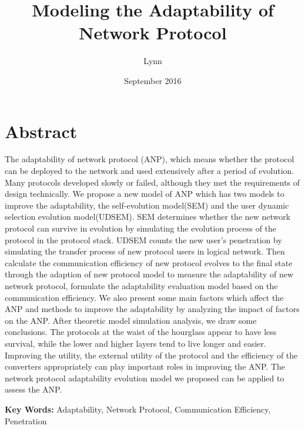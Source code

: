 \documentclass{article}
\title{Modeling the Adaptability of Network Protocol}
\author{Lynn }
\date{September 2016}
\begin{document}
\maketitle

\section*{Abstract}
The adaptability of network protocol (ANP), which means whether the protocol can be deployed to the network and used extensively after a period of evolution. Many protocols developed slowly or failed, although they met the requirements of design technically. We propose a new model of ANP  which has two models to improve the adaptability, the self-evolution model(SEM) and the user dynamic selection evolution model(UDSEM). SEM determines whether the new network protocol can survive in evolution by simulating the evolution process of the protocol in the protocol stack. UDSEM counts the new user's penetration by simulating the transfer process of new protocol users in logical network. Then calculate the communication efficiency of new protocol evolves to the final state through the adaption of new protocol model to measure the adaptability of new network protocol, formulate the adaptability evaluation model based on the communication efficiency. We also present some main factors which affect the ANP and methods to improve the adaptability by analyzing the impact of factors on the ANP.  After theoretic model simulation analysis, we draw some conclusions. The protocols at the waist of the hourglass appear to have less survival, while the lower and higher layers tend to live longer and easier. Improving the utility, the external utility of the protocol and the efficiency of the converters appropriately can play important roles in improving the ANP. The network protocol adaptability evolution model we proposed can be applied to assess the ANP. 

\setlength{\parskip}{0.5\baselineskip}
\par\noindent \textbf {Key Words:}
Adaptability, Network Protocol, Communication Efficiency, Penetration 
\end{document}
